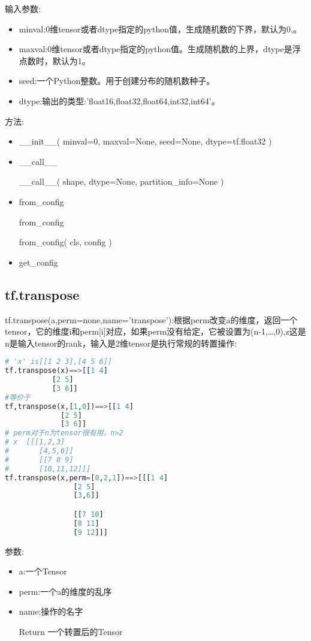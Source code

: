 输入参数:
\begin{itemize}
\item minval:0维tensor或者dtype指定的python值，生成随机数的下界，默认为0,。
\item maxval:0维tensor或者dtype指定的python值。生成随机数的上界，dtype是浮点数时，默认为1。
\item seed:一个Python整数。用于创建分布的随机数种子。
\item dtype:输出的类型:'float16,float32,float64,int32,int64'。
\end{itemize}
方法:
\begin{itemize}
\item \begin{python}__init__(
    minval=0,
    maxval=None,
    seed=None,
    dtype=tf.float32
)\end{python}
\item \_\_call\_\_
\begin{python}
__call__(
    shape,
    dtype=None,
    partition_info=None
)
\end{python}
\item from\_config
\begin{python}
from_config

from_config(
    cls,
    config
)
\end{python}
\item get\_config
\end{itemize}
\subsection{tf.transpose}
tf.transpose(a,perm=none,name='transpose'):根据perm改变a的维度，返回一个tensor，它的维度i和perm[i]对应，如果perm没有给定，它被设置为(n-1,\ldots,0),z这是n是输入tensor的rank，输入是2维tensor是执行常规的转置操作:
\begin{lstlisting}[language=Python]
# 'x' is[[1 2 3],[4 5 6]]
tf.transpose(x)==>[[1 4]
		   [2 5]
		   [3 6]]
#等价于
tf,transpose(x,[1,0])==>[[1 4]
			 [2 5]
			 [3 6]]
# perm对于n为tensor很有用，n>2
# x  [[[1,2,3]
#       [4,5,6]]
#       [[7 8 9]
#       [10,11,12]]]
tf.transpose(x,perm=[0,2,1])==>[[[1 4]
				[2 5]
				[3,6]]

				[[7 10]
				[8 11]
				[9 12]]]
\end{lstlisting}
参数:
\begin{itemize}
	\item a:一个Tensor
	\item perm:一个a的维度的乱序
	\item name:操作的名字
	\item[Return] 一个转置后的Tensor
\end{itemize}
